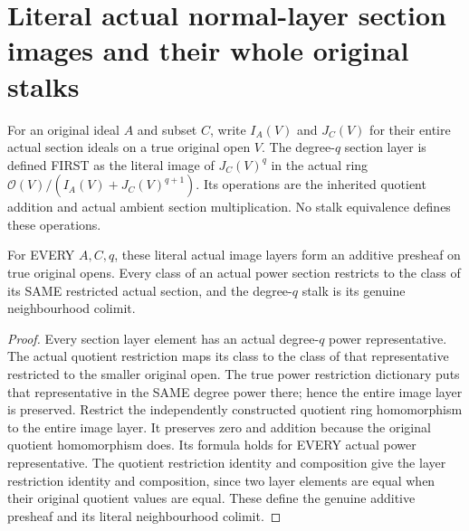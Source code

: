 \section{Literal actual normal-layer section images and their whole original stalks}

For an original ideal $A$ and subset $C$, write $I_A(V)$ and $J_C(V)$
for their entire actual section ideals on a true original open $V$.
The degree-$q$ section layer is defined FIRST as the literal image of
$J_C(V)^q$ in the actual ring $\mathcal O(V)/(I_A(V)+J_C(V)^{q+1})$.
Its operations are the inherited quotient addition and actual ambient
section multiplication. No stalk equivalence defines these operations.

\begin{definition}
\label{hir:real-domain-actual-normal-layer-section-presheaf}
\leanok
For EVERY $A,C,q$, these literal actual image layers form an additive
presheaf on true original opens. Every class of an actual power section
restricts to the class of its SAME restricted actual section, and the
degree-$q$ stalk is its genuine neighbourhood colimit.
\end{definition}
\begin{proof}
Every section layer element has an actual degree-$q$ power representative.
The actual quotient restriction maps its class to the class of that
representative restricted to the smaller original open. The true power
restriction dictionary puts that representative in the SAME degree
power there; hence the entire image layer is preserved. Restrict the
independently constructed quotient ring homomorphism to the entire
image layer. It preserves zero and addition because the original quotient
homomorphism does. Its formula holds for EVERY actual power representative.
The quotient restriction identity and composition give the layer
restriction identity and composition, since two layer elements are equal
when their original quotient values are equal. These define the genuine
additive presheaf and its literal neighbourhood colimit.
\end{proof}

